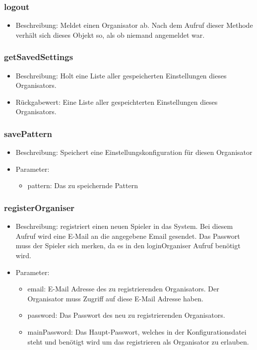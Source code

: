 \documentclass[a4paper]{scrreprt}
\begin{document}
	\subsubsection{logout}
	\begin{itemize}
		\item Beschreibung: Meldet einen Organisator ab. Nach dem Aufruf dieser Methode verhält sich dieses Objekt so, als ob niemand angemeldet war.
	\end{itemize}
	\subsubsection{getSavedSettings}
	\begin{itemize}
		\item Beschreibung: Holt eine Liste aller gespeicherten Einstellungen dieses Organisators.
		\item Rückgabewert: Eine Liste aller gespeichterten Einstellungen dieses Organisators. 
	\end{itemize}
	\subsubsection{savePattern}
	\begin{itemize}
		\item Beschreibung: Speichert eine Einstellungskonfiguration für diesen Organisator
		\item Parameter:
		\begin{itemize}
			\item pattern: Das zu speichernde Pattern
		\end{itemize}
	\end{itemize}
	\subsubsection{registerOrganiser}
    \begin{itemize}
        \item Beschreibung: registriert einen neuen Spieler in das System. Bei diesem Aufruf wird eine E-Mail an die angegebene Email gesendet. Das Passwort muss der Spieler sich merken, da es in den loginOrganiser Aufruf benötigt wird.
        \item Parameter:
        \begin{itemize}
            \item email: E-Mail Adresse des zu registrierenden Organisators. Der Organisator muss Zugriff auf diese E-Mail Adresse haben.
            \item password: Das Passwort des neu zu registrierenden Organisators.
            \item mainPassword: Das Haupt-Passwort, welches in der Konfigurationsdatei steht und benötigt wird um das registrieren als Organisator zu erlauben.
        \end{itemize}
    \end{itemize}
\end{document}
